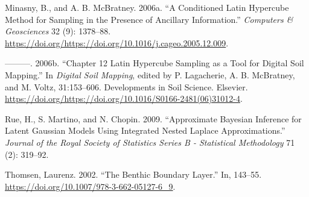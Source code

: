 \documentclass[a4paper]{article}
\begin{document}
\leavevmode\hypertarget{ref-Minasny-2006-1378}{}%
Minasny, B., and A. B. McBratney. 2006a. ``A Conditioned Latin Hypercube
Method for Sampling in the Presence of Ancillary Information.''
\emph{Computers \& Geosciences} 32 (9): 1378--88.
\url{https://doi.org/https://doi.org/10.1016/j.cageo.2005.12.009}.

\leavevmode\hypertarget{ref-Minasny-2006-153}{}%
---------. 2006b. ``Chapter 12 Latin Hypercube Sampling as a Tool for
Digital Soil Mapping.'' In \emph{Digital Soil Mapping}, edited by P.
Lagacherie, A. B. McBratney, and M. Voltz, 31:153--606. Developments in
Soil Science. Elsevier.
\url{https://doi.org/https://doi.org/10.1016/S0166-2481(06)31012-4}.

\leavevmode\hypertarget{ref-Rue-2009-319}{}%
Rue, H., S. Martino, and N. Chopin. 2009. ``Approximate Bayesian
Inference for Latent Gaussian Models Using Integrated Nested Laplace
Approximations.'' \emph{Journal of the Royal Society of Statistics
Series B - Statistical Methodology} 71 (2): 319--92.

\leavevmode\hypertarget{ref-Thomsen-2002-2002}{}%
Thomsen, Laurenz. 2002. ``The Benthic Boundary Layer.'' In, 143--55.
\url{https://doi.org/10.1007/978-3-662-05127-6_9}.
%


\end{document}
